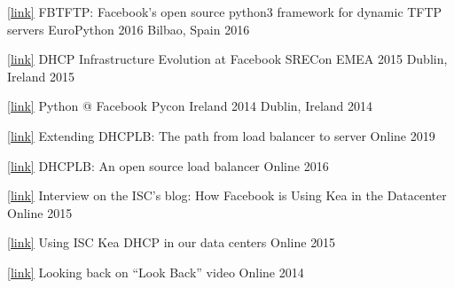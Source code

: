 
\begin{cvhonors}
  \cvhonor
  {\href{https://www.angelofailla.com/public_talks/2016-europython-fbtftp/}{[link]} FBTFTP: Facebook's open source python3 framework for dynamic TFTP servers} %
  {EuroPython 2016}
  {Bilbao, Spain} %
  {2016} %

  \cvhonor
  {\href{https://www.angelofailla.com/public_talks/2015-srecon-emea-kea/}{[link]} DHCP Infrastructure Evolution at Facebook}
  {SRECon EMEA 2015}
  {Dublin, Ireland} %
  {2015} %

  \cvhonor
  {\href{https://www.angelofailla.com/public_talks/2014-pyconireland-python@fb/}{[link]} Python @ Facebook}
  {Pycon Ireland 2014}
  {Dublin, Ireland} %
  {2014} %
\end{cvhonors}


\begin{cvhonors}
  \cvhonor
  {\href{https://engineering.fb.com/2019/05/28/data-infrastructure/dhcplb-server/}{[link]} Extending DHCPLB: The path from load balancer to server}
  {} %
  {Online} %
  {2019} %

  \cvhonor
  {\href{https://engineering.fb.com/2016/09/13/data-infrastructure/dhcplb-an-open-source-load-balancer/}{[link]} DHCPLB: An open source load balancer}
  {} %
  {Online} %
  {2016} %

  \cvhonor
  {\href{https://www.isc.org/blogs/how-facebook-is-using-kea-in-the-datacenter/}{[link]} Interview on the ISC's blog: How Facebook is Using Kea in the Datacenter}
  {} %
  {Online} %
  {2015} %

  \cvhonor
  {\href{https://engineering.fb.com/2015/07/21/core-infra/using-isc-kea-dhcp-in-our-data-centers/}{[link]} Using ISC Kea DHCP in our data centers}
  {} %
  {Online} %
  {2015} %

  \cvhonor
  {\href{https://engineering.fb.com/2014/03/13/web/looking-back-on-look-back-videos/}{[link]} Looking back on “Look Back” video}
  {}
  {Online} %
  {2014} %

\end{cvhonors}